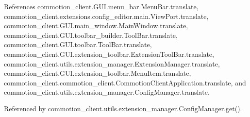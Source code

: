 References commotion\+\_\+client.\+G\+U\+I.\+menu\+\_\+bar.\+Menu\+Bar.\+translate, commotion\+\_\+client.\+extensions.\+config\+\_\+editor.\+main.\+View\+Port.\+translate, commotion\+\_\+client.\+G\+U\+I.\+main\+\_\+window.\+Main\+Window.\+translate, commotion\+\_\+client.\+G\+U\+I.\+toolbar\+\_\+builder.\+Tool\+Bar.\+translate, commotion\+\_\+client.\+G\+U\+I.\+toolbar.\+Tool\+Bar.\+translate, commotion\+\_\+client.\+G\+U\+I.\+extension\+\_\+toolbar.\+Extension\+Tool\+Bar.\+translate, commotion\+\_\+client.\+utils.\+extension\+\_\+manager.\+Extension\+Manager.\+translate, commotion\+\_\+client.\+G\+U\+I.\+extension\+\_\+toolbar.\+Menu\+Item.\+translate, commotion\+\_\+client.\+commotion\+\_\+client.\+Commotion\+Client\+Application.\+translate, and commotion\+\_\+client.\+utils.\+extension\+\_\+manager.\+Config\+Manager.\+translate.



Referenced by commotion\+\_\+client.\+utils.\+extension\+\_\+manager.\+Config\+Manager.\+get().



